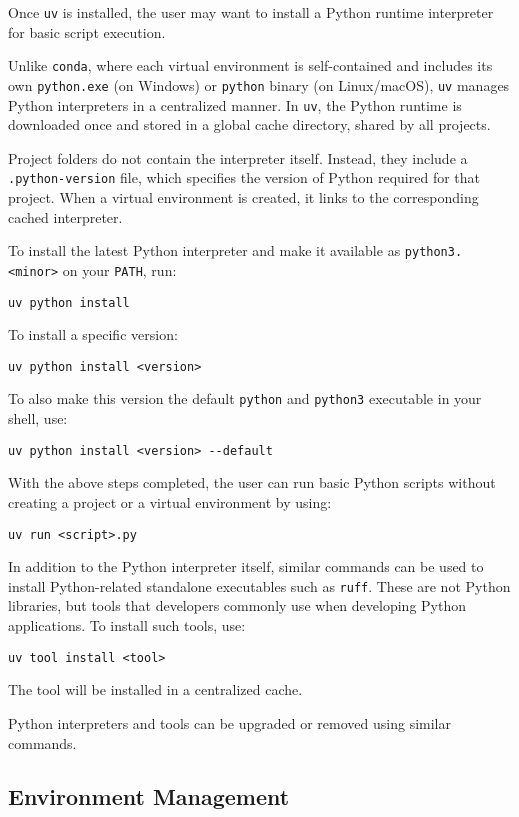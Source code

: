 Once \verb|uv| is installed, the user may want to install a Python runtime interpreter for basic script execution.

Unlike \verb|conda|, where each virtual environment is self-contained and includes its own \verb|python.exe| (on Windows) or \verb|python| binary (on Linux/macOS), \verb|uv| manages Python interpreters in a centralized manner. In \verb|uv|, the Python runtime is downloaded once and stored in a global cache directory, shared by all projects.

Project folders do not contain the interpreter itself. Instead, they include a \verb|.python-version| file, which specifies the version of Python required for that project. When a virtual environment is created, it links to the corresponding cached interpreter.

To install the latest Python interpreter and make it available as \verb|python3.<minor>| on your \texttt{PATH}, run:
\begin{lstlisting}
uv python install
\end{lstlisting}

To install a specific version:
\begin{lstlisting}
uv python install <version>
\end{lstlisting}

To also make this version the default \verb|python| and \verb|python3| executable in your shell, use:
\begin{lstlisting}
uv python install <version> --default
\end{lstlisting}

With the above steps completed, the user can run basic Python scripts without creating a project or a virtual environment by using:
\begin{lstlisting}
uv run <script>.py
\end{lstlisting}

In addition to the Python interpreter itself, similar commands can be used to install Python-related standalone executables such as \verb|ruff|. These are not Python libraries, but tools that developers commonly use when developing Python applications. To install such tools, use:
\begin{lstlisting}
uv tool install <tool>
\end{lstlisting}
The tool will be installed in a centralized cache.

Python interpreters and tools can be upgraded or removed using similar commands.


\subsection{Environment Management}


